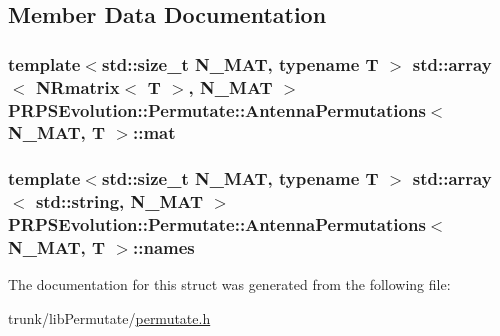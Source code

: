 \subsection{\-Member \-Data \-Documentation}
\hypertarget{struct_p_r_p_s_evolution_1_1_permutate_1_1_antenna_permutations_a4c2a15678968ce79f6332e272bfc9226}{
\subsubsection[{mat}]{\setlength{\rightskip}{0pt plus 5cm}template$<$std\-::size\-\_\-t \-N\-\_\-\-M\-A\-T, typename T $>$ std\-::array$<$ \-N\-Rmatrix$<$ \-T $>$, \-N\-\_\-\-M\-A\-T $>$ {\bf \-P\-R\-P\-S\-Evolution\-::\-Permutate\-::\-Antenna\-Permutations}$<$ \-N\-\_\-\-M\-A\-T, \-T $>$\-::{\bf mat}}}\label{struct_p_r_p_s_evolution_1_1_permutate_1_1_antenna_permutations_a4c2a15678968ce79f6332e272bfc9226}
\hypertarget{struct_p_r_p_s_evolution_1_1_permutate_1_1_antenna_permutations_ab929cd371b9c25afcd6f0acd40490792}{
\subsubsection[{names}]{\setlength{\rightskip}{0pt plus 5cm}template$<$std\-::size\-\_\-t \-N\-\_\-\-M\-A\-T, typename T $>$ std\-::array$<$ std\-::string, \-N\-\_\-\-M\-A\-T $>$ {\bf \-P\-R\-P\-S\-Evolution\-::\-Permutate\-::\-Antenna\-Permutations}$<$ \-N\-\_\-\-M\-A\-T, \-T $>$\-::{\bf names}}}\label{struct_p_r_p_s_evolution_1_1_permutate_1_1_antenna_permutations_ab929cd371b9c25afcd6f0acd40490792}


\-The documentation for this struct was generated from the following file\-:\begin{DoxyCompactItemize}
\item 
trunk/lib\-Permutate/\hyperlink{permutate_8h}{permutate.\-h}\end{DoxyCompactItemize}

